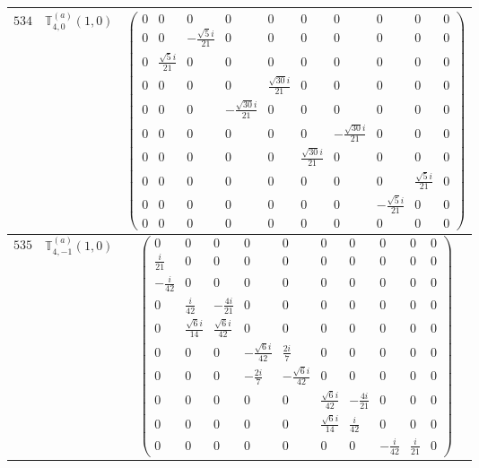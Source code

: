 \documentclass[fleqn,8pt,landscape]{jsarticle}
\begin{document}
\begin{center}
\begin{longtable}{ccc}
$ 534 $ & $ \mathbb{T}_{4,0}^{(a)}(1,0) $ & $ \begin{pmatrix} 0 & 0 & 0 & 0 & 0 & 0 & 0 & 0 & 0 & 0 \\ 0 & 0 & - \frac{\sqrt{5} i}{21} & 0 & 0 & 0 & 0 & 0 & 0 & 0 \\ 0 & \frac{\sqrt{5} i}{21} & 0 & 0 & 0 & 0 & 0 & 0 & 0 & 0 \\ 0 & 0 & 0 & 0 & \frac{\sqrt{30} i}{21} & 0 & 0 & 0 & 0 & 0 \\ 0 & 0 & 0 & - \frac{\sqrt{30} i}{21} & 0 & 0 & 0 & 0 & 0 & 0 \\ 0 & 0 & 0 & 0 & 0 & 0 & - \frac{\sqrt{30} i}{21} & 0 & 0 & 0 \\ 0 & 0 & 0 & 0 & 0 & \frac{\sqrt{30} i}{21} & 0 & 0 & 0 & 0 \\ 0 & 0 & 0 & 0 & 0 & 0 & 0 & 0 & \frac{\sqrt{5} i}{21} & 0 \\ 0 & 0 & 0 & 0 & 0 & 0 & 0 & - \frac{\sqrt{5} i}{21} & 0 & 0 \\ 0 & 0 & 0 & 0 & 0 & 0 & 0 & 0 & 0 & 0 \end{pmatrix} $ \\ \hline
$ 535 $ & $ \mathbb{T}_{4,-1}^{(a)}(1,0) $ & $ \begin{pmatrix} 0 & 0 & 0 & 0 & 0 & 0 & 0 & 0 & 0 & 0 \\ \frac{i}{21} & 0 & 0 & 0 & 0 & 0 & 0 & 0 & 0 & 0 \\ - \frac{i}{42} & 0 & 0 & 0 & 0 & 0 & 0 & 0 & 0 & 0 \\ 0 & \frac{i}{42} & - \frac{4 i}{21} & 0 & 0 & 0 & 0 & 0 & 0 & 0 \\ 0 & \frac{\sqrt{6} i}{14} & \frac{\sqrt{6} i}{42} & 0 & 0 & 0 & 0 & 0 & 0 & 0 \\ 0 & 0 & 0 & - \frac{\sqrt{6} i}{42} & \frac{2 i}{7} & 0 & 0 & 0 & 0 & 0 \\ 0 & 0 & 0 & - \frac{2 i}{7} & - \frac{\sqrt{6} i}{42} & 0 & 0 & 0 & 0 & 0 \\ 0 & 0 & 0 & 0 & 0 & \frac{\sqrt{6} i}{42} & - \frac{4 i}{21} & 0 & 0 & 0 \\ 0 & 0 & 0 & 0 & 0 & \frac{\sqrt{6} i}{14} & \frac{i}{42} & 0 & 0 & 0 \\ 0 & 0 & 0 & 0 & 0 & 0 & 0 & - \frac{i}{42} & \frac{i}{21} & 0 \end{pmatrix} $ \\ \hline

\end{longtable}
\end{center}
\end{document}
